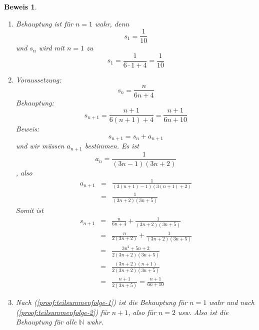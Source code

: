 \documentclass{report}
\newtheorem{myproof}{Beweis}
\begin{document}
\begin{myproof}\begin{enumerate}
\item \label{proof:teilsummenfolge-1} Behauptung ist für $n=1$ wahr, denn
\begin{equation}s_1 = \frac{1}{10}\end{equation}
und $s_n$ wird mit $n=1$ zu
\begin{equation}s_1 = \frac{1}{6 \cdot 1 + 4} = \frac{1}{10}\end{equation}
\item \label{proof:teilsummenfolge-2} Voraussetzung: 
\begin{equation}s_n = \frac{n}{6n+4}\end{equation}
Behauptung:
\begin{equation}s_{n+1} = \frac{n+1}{6(n+1) + 4} = \frac{n+1}{6n+10}\end{equation}
Beweis:
\begin{equation}s_{n+1} = s_n + a_{n+1}\end{equation}
und wir müssen $a_{n+1}$ bestimmen. Es ist
\begin{equation}a_n = \frac{1}{(3n-1)(3n+2)}\end{equation}
, also
\begin{eqnarray}a_{n+1} & = & \frac{1}{(3(n+1)-1)(3(n+1)+2)} \\
& = & \frac{1}{(3n+2)(3n+5)}\end{eqnarray}
Somit ist
\begin{eqnarray}s_{n+1} & = & \frac{n}{6n+4} + \frac{1}{(3n+2)(3n+5)} \\
& = & \frac{n}{2(3n+2)} + \frac{1}{(3n+2)(3n+5)} \\
& = & \frac{3n^2+5n+2}{2(3n+2)(3n+5)} \\
& = & \frac{(3n+2)(n+1)}{2(3n+2)(3n+5)} \\
& = & \frac{n+1}{2(3n+5)} = \frac{n+1}{6n+10}\end{eqnarray}
\item Nach (\ref{proof:teilsummenfolge-1}) ist die Behauptung für $n=1$ wahr und nach (\ref{proof:teilsummenfolge-2}) für $n+1$, also für $n=2$ usw. Also ist die Behauptung für alle $\mathbb{N}$ wahr.
\end{enumerate}\end{myproof}
\end{document}
